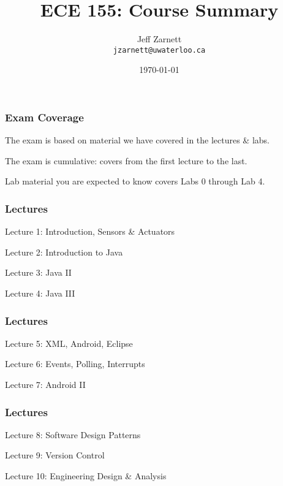 
\usepackage{tikz-3dplot}

\title{ECE 155: Course Summary}

\author{Jeff Zarnett \\ \small \texttt{jzarnett@uwaterloo.ca}}
\date{\today}



\begin{frame}
  \titlepage
\end{frame}


\begin{frame}
\frametitle{Exam Coverage}

The exam is based on material we have covered in the lectures \& labs.

The exam is cumulative: covers from the first lecture to the last.

Lab material you are expected to know covers Labs 0 through Lab 4.

\end{frame}


\begin{frame}
\frametitle{Lectures}

{\LARGE
Lecture 1: Introduction, Sensors \& Actuators

Lecture 2: Introduction to Java

Lecture 3: Java II

Lecture 4: Java III}

\end{frame}

\begin{frame}
\frametitle{Lectures}

{\LARGE

Lecture 5: XML, Android, Eclipse

Lecture 6: Events, Polling, Interrupts

Lecture 7: Android II

}

\end{frame}

\begin{frame}
\frametitle{Lectures}

{\LARGE
 
Lecture 8: Software Design Patterns

Lecture 9: Version Control

Lecture 10: Engineering Design \& Analysis 

}

\end{frame}


